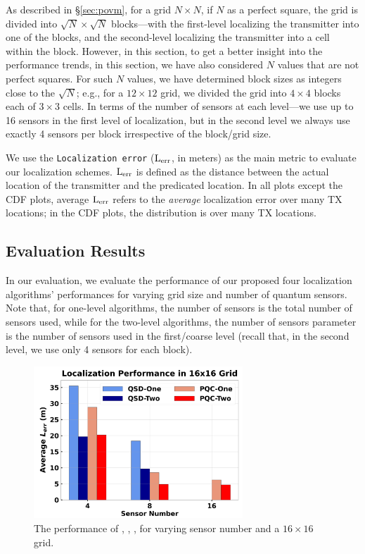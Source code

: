 As described in \S\ref{sec:povm}, for a grid $N \times N$, if $N$ as a perfect square, 
the grid is divided into $\sqrt{N} \times \sqrt{N}$ blocks---with the first-level localizing the transmitter into one of the blocks, and the second-level localizing
the transmitter into a cell within the block.
However, in this section, to get a better insight into the performance trends, in this section, we have also considered  $N$ values that are not perfect squares. 
For such $N$ values, we have determined block sizes as integers close to the $\sqrt{N}$; e.g., for a $12\times12$ grid, we divided the grid into $4 \times 4$ blocks each of $3 \times 3$ cells.
In terms of the number of sensors at each level---we use up to 16 sensors in the first level of localization, but in the second level we always use exactly 4 sensors per block irrespective of the block/grid size.

We use the {\tt Localization error} ($\mathrm{L_{err}}$, in meters) as the main metric to evaluate our localization schemes. $\mathrm{L_{err}}$ is defined as the distance between the actual location of the transmitter and the predicated location. 
In all plots except the CDF plots, average $\mathrm{L_{err}}$ refers to the
{\em average} localization error over many TX locations; 
in the CDF plots, the distribution is over many TX locations.

\subsection{Evaluation Results}
In our evaluation, we evaluate the performance of our proposed four localization algorithms' performances for varying grid size and number of quantum sensors.
Note that, for one-level algorithms, the number of sensors is the total number of sensors used, while for the two-level algorithms, the number of sensors parameter is the number of sensors used in the first/coarse level (recall that, in the second level, we use only 4 sensors for each block). 

\begin{figure}[t]
    \centering
    \includegraphics[width=0.7\textwidth]{chapters/qce/figures/continuous.varysensornum.png}
    \caption{The performance of \povmone, \povm, \pqcone, \pqctwo for varying sensor number and a $16\times16$ grid.}
    \label{fig:continuous.varysen}
\end{figure}

